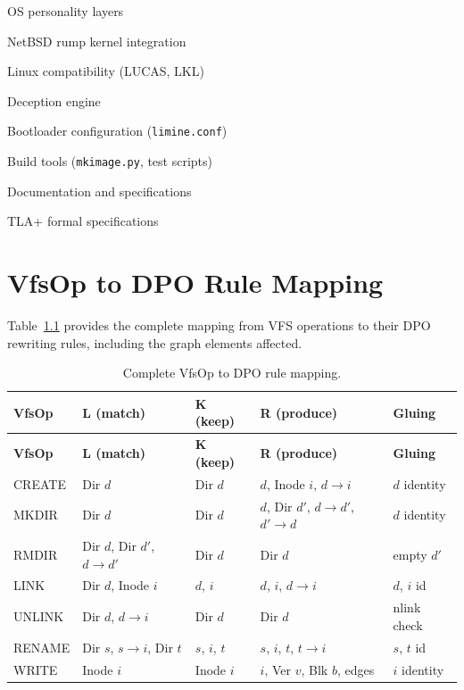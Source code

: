 \documentclass[11pt,a4paper,twoside]{report}
\theoremstyle{definition}
\begin{document}
\begin{description}[leftmargin=0em]
\begin{description}[leftmargin=1em]
    \end{description}
  \item[\texttt{personality/}] OS personality layers
    \begin{description}[leftmargin=1em]
      \item[\texttt{bsd/}] NetBSD rump kernel integration
      \item[\texttt{linux/}] Linux compatibility (LUCAS, LKL)
      \item[\texttt{common/deception/}] Deception engine
    \end{description}
  \item[\texttt{boot/}] Bootloader configuration (\texttt{limine.conf})
  \item[\texttt{scripts/}] Build tools (\texttt{mkimage.py}, test scripts)
  \item[\texttt{docs/}] Documentation and specifications
  \item[\texttt{specs/}] TLA+ formal specifications
\end{description}


\chapter{VfsOp to DPO Rule Mapping}
\label{app:vfsop}

Table~\ref{tab:vfsop-dpo} provides the complete mapping from VFS operations
to their DPO rewriting rules, including the graph elements affected.

\begin{longtable}{l l l l l}
\caption{Complete VfsOp to DPO rule mapping.} \label{tab:vfsop-dpo} \\
\toprule
\textbf{VfsOp} & \textbf{L (match)} & \textbf{K (keep)} & \textbf{R (produce)} & \textbf{Gluing} \\
\midrule
\endfirsthead
\toprule
\textbf{VfsOp} & \textbf{L (match)} & \textbf{K (keep)} & \textbf{R (produce)} & \textbf{Gluing} \\
\midrule
\endhead
\bottomrule
\endlastfoot
CREATE & Dir $d$ & Dir $d$ & $d$, Inode $i$, $d \to i$ & $d$ identity \\
MKDIR  & Dir $d$ & Dir $d$ & $d$, Dir $d'$, $d \to d'$, $d' \to d$ & $d$ identity \\
RMDIR  & Dir $d$, Dir $d'$, $d \to d'$ & Dir $d$ & Dir $d$ & empty $d'$ \\
LINK   & Dir $d$, Inode $i$ & $d$, $i$ & $d$, $i$, $d \to i$ & $d$, $i$ id \\
UNLINK & Dir $d$, $d \to i$ & Dir $d$ & Dir $d$ & nlink check \\
RENAME & Dir $s$, $s \to i$, Dir $t$ & $s$, $i$, $t$ & $s$, $i$, $t$, $t \to i$ & $s$, $t$ id \\
WRITE  & Inode $i$ & Inode $i$ & $i$, Ver $v$, Blk $b$, edges & $i$ identity \\
\end{longtable}
\end{document}

